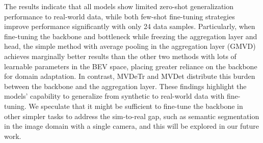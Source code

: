 The results indicate that all models show limited zero-shot generalization performance to real-world data, while both few-shot fine-tuning strategies improve performance significantly with only 24 data samples. Particularly, when fine-tuning the backbone and bottleneck while freezing the aggregation layer and head, the simple method with average pooling in the aggregation layer (GMVD) achieves marginally better results than the other two methods with lots of learnable parameters in the BEV space, placing greater reliance on the backbone for domain adaptation. In contrast, MVDeTr and MVDet distribute this burden between the backbone and the aggregation layer. These findings highlight the models' capability to generalize from synthetic to real-world data with fine-tuning. We speculate that it might be sufficient to fine-tune the backbone in other simpler tasks to address the sim-to-real gap, such as semantic segmentation in the image domain with a single camera, and this will be explored in our future work.



